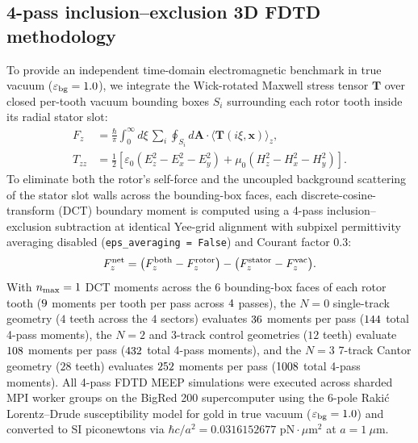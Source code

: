 \documentclass[pdflatex,sn-nature]{sn-jnl}
\begin{document}
\subsection*{4-pass inclusion--exclusion 3D FDTD methodology}
To provide an independent time-domain electromagnetic benchmark in true vacuum ($\varepsilon_{\rm bg}=1.0$), we integrate the Wick-rotated Maxwell stress tensor $\mathbf{T}$ over closed per-tooth vacuum bounding boxes $S_i$ surrounding each rotor tooth inside its radial stator slot\cite{oskooi2010,rodriguez2011}:
\begin{equation}
\begin{aligned}
F_z &= \frac{\hbar}{\pi} \int_0^\infty d\xi \, \sum_{i} \oint_{S_i} d\mathbf{A} \cdot \langle \mathbf{T}(i\xi, \mathbf{x}) \rangle_z, \\
T_{zz} &= \frac{1}{2} \left[ \varepsilon_0 (E_z^2 - E_x^2 - E_y^2) + \mu_0 (H_z^2 - H_x^2 - H_y^2) \right].
\end{aligned}
\label{eq:methods_fdtd}
\end{equation}
To eliminate both the rotor's self-force and the uncoupled background scattering of the stator slot walls across the bounding-box faces, each discrete-cosine-transform (DCT) boundary moment is computed using a 4-pass inclusion--exclusion subtraction at identical Yee-grid alignment with subpixel permittivity averaging disabled (\texttt{eps\_averaging = False}) and Courant factor $0.3$:
\begin{equation}
F_z^{\rm net} = \bigl(F_z^{\rm both} - F_z^{\rm rotor}\bigr) - \bigl(F_z^{\rm stator} - F_z^{\rm vac}\bigr).
\label{eq:methods_four_pass}
\end{equation}
With $n_{\rm max}=1$ DCT moments across the $6$ bounding-box faces of each rotor tooth ($9{}$ moments per tooth per pass across $4{}$ passes), the $N=0$ single-track geometry ($4$ teeth across the $4$ sectors) evaluates $36{}$ moments per pass ($144{}$ total 4-pass moments), the $N=2$ and 3-track control geometries ($12$ teeth) evaluate $108{}$ moments per pass ($432{}$ total 4-pass moments), and the $N=3$ 7-track Cantor geometry ($28$ teeth) evaluates $252{}$ moments per pass ($1008{}$ total 4-pass moments). All 4-pass FDTD MEEP simulations were executed across sharded MPI worker groups on the BigRed 200 supercomputer using the 6-pole Raki\'c Lorentz--Drude susceptibility model for gold in true vacuum ($\varepsilon_{\rm bg}=1.0$) and converted to SI piconewtons via $\hbar c / a^2 = 0.0316152677\text{ pN}\cdot\mu\text{m}^2$ at $a = 1\ \mu\text{m}$.
\end{document}
